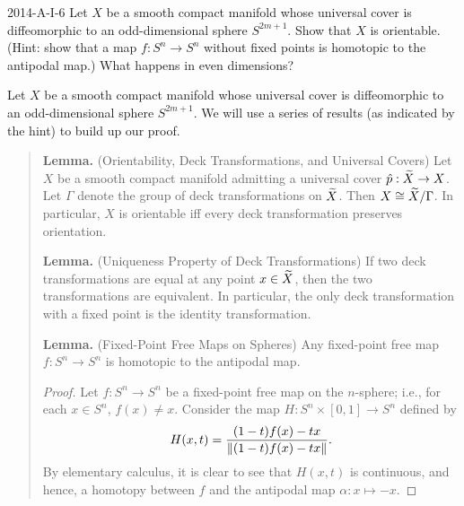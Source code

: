 \documentclass{article}
\begin{document}
	\begin{prb}{2014-A-I-6}
		Let $X$ be a smooth compact manifold whose universal cover is diffeomorphic to an odd-dimensional sphere $S^{2m + 1}$. Show that $X$ is orientable. (Hint:  show that a map  $f: S^{n} \to S^{n}$ without fixed points is homotopic to the antipodal map.) What happens in even dimensions?
	\end{prb}
	Let $X$ be a smooth compact manifold whose universal cover is diffeomorphic to an odd-dimensional sphere $S^{2m + 1}$.  We will use a series of results (as indicated by the hint) to build up our proof. 
		\begin{quote}
			\textbf{Lemma.} (Orientability, Deck Transformations, and Universal Covers) Let $X$ be a smooth compact manifold admitting a universal cover $\hat{p}: \widetilde{X} \to X$. Let $\Gamma$ denote the group of deck transformations on $\widetilde{X}$. Then $X \cong \widetilde{X}/\Gamma$. In particular, $X$ is orientable iff every deck transformation preserves orientation.	
					
			\textbf{Lemma.} (Uniqueness Property of Deck Transformations) If two deck transformations are equal  at any point $x \in \widetilde{X}$, then the two transformations are equivalent. In particular, the only deck transformation with a fixed point is the identity transformation. 
			
			\textbf{Lemma.} (Fixed-Point Free Maps on Spheres) Any fixed-point free map $f: S^n \to S^n$ is homotopic to the antipodal map. \vspace{-0.25cm}
			\begin{proof}
				Let $f: S^n \to S^n$ be a fixed-point free map on the $n$-sphere; i.e., for each $x \in S^{n}$, $f(x) \neq x$. Consider the map $H: S^n \times [0,1] \to S^n$ defined by 
				\begin{equation*}
					H(x,t) = \frac{(1 - t)f(x) -tx}{\left\Vert (1 - t)f(x) - tx \right\Vert}. 
				\end{equation*}
				By elementary calculus, it is clear to see that $H(x, t)$ is continuous, and hence, a homotopy between $f$ and the antipodal map $\alpha: x \mapsto -x$. 
			\end{proof}
		\end{quote}
\end{document}
